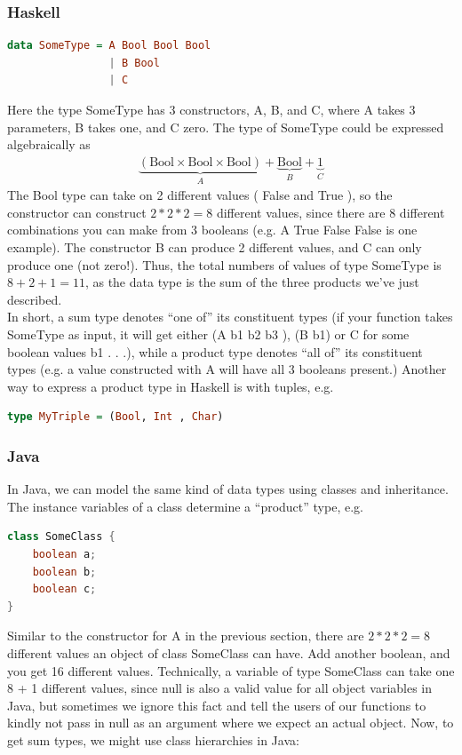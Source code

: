 \documentclass[tikz, border=5mm]{article}
\begin{document}
\begin{itemize}
            \subsubsection*{Haskell}
            \begin{lstlisting}[language=Haskell]
data SomeType = A Bool Bool Bool
                | B Bool
                | C
            \end{lstlisting}
            Here the type SomeType has 3 constructors, A, B, and C, where A takes 3 parameters, B takes one, and C zero. 
            The type of SomeType could be expressed algebraically as
            \begin{align*}
                \underbrace{(\text{Bool} \times \text{Bool} \times \text{Bool})}_{A} + \underbrace{\text{Bool}}_{B} + \underbrace{1}_{C}
            \end{align*}
            The Bool type can take on 2 different values
            ( False and True ), so the constructor
            can construct $2 * 2 * 2 = 8$ different values, since there are 8 different combinations you can
            make from 3 booleans (e.g. A True False False is one example). The constructor B can
            produce 2 different values, and C can only produce one (not zero!).
            Thus, the total numbers of values of type SomeType is $8 + 2 + 1 = 11$, as the data type
            is the sum of the three products we've just described.\\
            In short, a sum type denotes “one of” its constituent types (if your function takes SomeType
            as input, it will get either (A b1 b2 b3 ), (B b1) or C for some boolean values b1 . . .), while
            a product type denotes “all of” its constituent types (e.g. a value constructed with A will
            have all 3 booleans present.) Another way to express a product type in Haskell is with tuples,
            e.g.
            \begin{lstlisting}[language=Haskell]
type MyTriple = (Bool, Int , Char)
            \end{lstlisting}
            \subsubsection*{Java}
            In Java, we can model the same kind of data types using classes and inheritance. The instance
            variables of a class determine a “product” type, e.g.
            \begin{lstlisting}[language=Java]
class SomeClass {
    boolean a;
    boolean b;
    boolean c;
}
            \end{lstlisting}
        Similar to the constructor for A in the previous section, there are $2 * 2 * 2 = 8$ different
values an object of class SomeClass can have. Add another boolean, and you get 16 different
values. Technically, a variable of type SomeClass can take one 8 + 1 different values, since
null is also a valid value for all object variables in Java, but sometimes we ignore this fact
and tell the users of our functions to kindly not pass in null as an argument where we expect
an actual object.
Now, to get sum types, we might use class hierarchies in Java:


\end{itemize}
\end{document}
